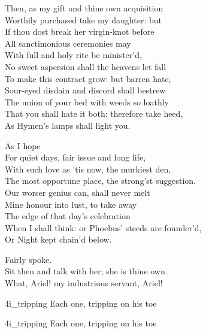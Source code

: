 \begin{verse_speech}[Prospero] 
Then, as my gift and thine own acquisition\\
Worthily purchased take my daughter: but\\
If thou dost break her virgin-knot before\\
All sanctimonious ceremonies may\\
With full and holy rite be minister'd,\\
No sweet aspersion shall the heavens let fall\\
To make this contract grow: but barren hate,\\
Sour-eyed disdain and discord shall bestrew\\
The union of your bed with weeds so loathly\\
That you shall hate it both: therefore take heed,\\
As Hymen's lamps shall light you.
\end{verse_speech}

\begin{verse_speech}[Ferdinand] 
As I hope\\
For quiet days, fair issue and long life,\\
With such love as 'tis now, the murkiest den,\\
The most opportune place, the strong'st suggestion.\\
Our worser genius can, shall never melt\\
Mine honour into lust, to take away\\
The edge of that day's celebration\\
When I shall think: or Phoebus' steeds are founder'd,\\
Or Night kept chain'd below.
\end{verse_speech}

\begin{verse_speech}[Prospero] 
Fairly spoke.\\
Sit then and talk with her; she is thine own.\\
What, Ariel! my industrious servant, Ariel!
\end{verse_speech}



\begin{pictures} %
	\begin{letter}
		\begin{colorbigpic}
			[1.1]
			{4i_tripping}
			{Each one, tripping on his toe}
		\end{colorbigpic}
	\end{letter}
	\begin{a4}
		\begin{colorbigpic}
			[1.1]
			{4i_tripping}
			{Each one, tripping on his toe}
		\end{colorbigpic}
	\end{a4}
\end{pictures}

